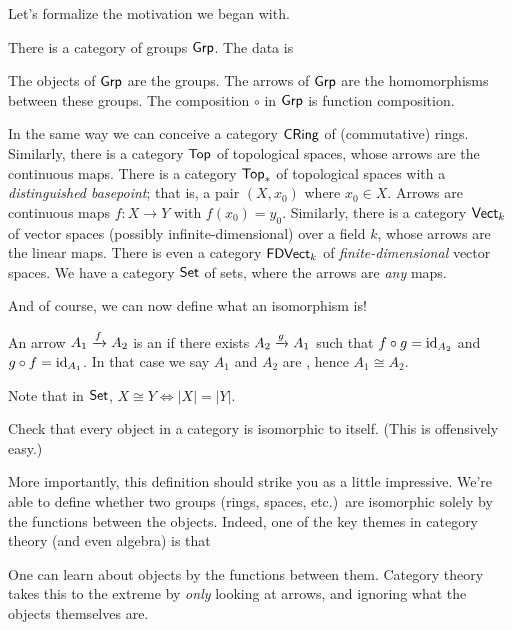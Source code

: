 Let's formalize the motivation we began with.
\begin{example}
	\listhack
	\label{example:basic_categories}
	\begin{enumerate}[(a)]
		\ii There is a category of groups $\mathsf{Grp}$. The data is
		\begin{itemize}
			\ii The objects of $\mathsf{Grp}$ are the groups.
			\ii The arrows of $\mathsf{Grp}$ are the homomorphisms between these groups.
			\ii The composition $\circ$ in $\mathsf{Grp}$ is function composition.
		\end{itemize}
		\ii In the same way we can conceive a category $\mathsf{CRing}$ of (commutative) rings.
		\ii Similarly, there is a category $\mathsf{Top}$ of topological spaces,
		whose arrows are the continuous maps.
		\ii There is a category $\mathsf{Top}_\ast$ of topological spaces with a \emph{distinguished basepoint};
		that is, a pair $(X, x_0)$ where $x_0 \in X$.
		Arrows are continuous maps $f \colon X \to Y$ with $f(x_0) = y_0$.
		\ii Similarly, there is a category $\mathsf{Vect}_k$ of
		vector spaces (possibly infinite-dimensional) over a field $k$,
		whose arrows are the linear maps.
		There is even a category $\mathsf{FDVect}_k$ of
		\emph{finite-dimensional} vector spaces.
		\ii We have a category $\mathsf{Set}$ of sets,
		where the arrows are \emph{any} maps.
	\end{enumerate}
\end{example}
And of course, we can now define what an isomorphism is!
\begin{definition}
	An arrow $A_1 \xrightarrow{f} A_2$ is an 
	if there exists $A_2 \xrightarrow{g} A_1$ such that $f \circ g = \mathrm{id}_{A_2}$
	and $g \circ f = \mathrm{id}_{A_1}$.
	In that case we say $A_1$ and $A_2$ are , hence $A_1 \cong A_2$.
\end{definition}
\begin{remark}
	Note that in $\mathsf{Set}$, $X \cong Y
	\iff \left\lvert X \right\rvert = \left\lvert Y \right\rvert$.
\end{remark}
\begin{ques}
	Check that every object in a category is isomorphic to itself.
	(This is offensively easy.)
\end{ques}
More importantly, this definition should strike you as a little impressive.
We're able to define whether two groups (rings, spaces, etc.)\ are isomorphic
solely by the functions between the objects.
Indeed, one of the key themes in category theory (and even algebra) is that
\begin{moral}
	One can learn about objects by the functions between them.
	Category theory takes this to the extreme by \emph{only} looking at arrows,
	and ignoring what the objects themselves are.
\end{moral}

